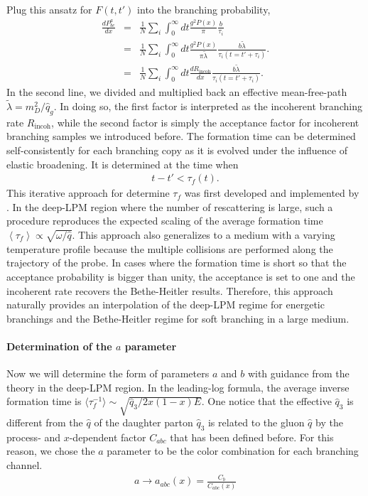 Plug this ansatz for $F(t, t')$ into the branching probability,
\begin{eqnarray}
\frac{dP^{a}_{bc}}{dx} &=& \frac{1}{N}\sum_i \int_0^\infty dt \frac{g^2 P(x)}{\pi} \frac{b}{\tau_i} \\  
 &=& \frac{1}{N}\sum_i \int_0^\infty dt \frac{g^2 P(x)}{\pi \tilde{\lambda}} \frac{b \tilde{\lambda}}{\tau_i(t=t'+\tau_i)}.\\
  &=& \frac{1}{N}\sum_i \int_0^\infty dt \frac{dR_{\textrm{incoh}}}{dx} \frac{b \tilde{\lambda}}{\tau_i(t=t'+\tau_i)}.
\end{eqnarray}
In the second line, we divided and multiplied back an effective mean-free-path $\tilde{\lambda} = m_D^2/\hat{q}_g$.
In doing so, the first factor is interpreted as the incoherent branching rate $R_{\textrm{incoh}}$, while the second factor is simply the acceptance factor for incoherent branching samples we introduced before.
The formation time can be determined self-consistently for each branching copy as it is evolved under the influence of elastic broadening.
It is determined at the time when
\begin{eqnarray}
t - t' < \tau_f(t). 
\end{eqnarray}
This iterative approach for determine $\tau_f$ was first developed and implemented by \cite{Zapp:2011ya}.
In the deep-LPM region where the number of rescattering is large, such a procedure reproduces the expected scaling of the average formation time $\left\langle\tau_f\right\rangle \propto \sqrt{\omega/\hat{q}}$.
This approach also generalizes to a medium with a varying temperature profile because the multiple collisions are performed along the trajectory of the probe.
In cases where the formation time is short so that the acceptance probability is bigger than unity, the acceptance is set to one and the incoherent rate recovers the Bethe-Heitler results.
Therefore, this approach naturally provides an interpolation of the deep-LPM regime for energetic branchings and the Bethe-Heitler regime for soft branching in a large medium.

\paragraph{Determination of the $a$ parameter} Now we will determine the form of parameters $a$ and $b$ with guidance from the theory in the deep-LPM region.
In the leading-log formula, the average inverse formation time is $\langle\tau_f^{-1}\rangle \sim \sqrt{\hat{q}_3 / 2x(1-x)E}$. 
One notice that the effective $\hat{q}_3$ is different from the $\hat{q}$ of the daughter parton 
$\hat{q}_3$ is related to the gluon $\hat{q}$ by the process- and $x$-dependent factor $C_{abc}$ that has been defined before.
For this reason, we chose the $a$ parameter to be the color combination for each branching channel.
\begin{eqnarray}
a \rightarrow a_{abc}(x) = \frac{C_b}{C_{abc}(x)}
\end{eqnarray}

